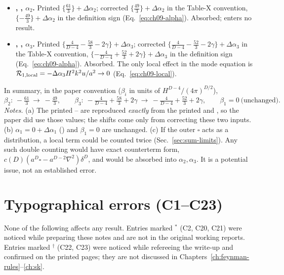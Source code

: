 \begin{itemize}[leftmargin=14pt,itemsep=2pt]
\item[\textbf{B5}] \textbf{\PII, , $\alpha_2$.} Printed $\{\tfrac{61}{3}\}+\Delta\alpha_2$; corrected $\{\tfrac{49}{3}\}+\Delta\alpha_2$ in the Table-X
convention, $\{-\tfrac{49}{3}\}+\Delta\alpha_2$ in the definition sign (Eq.~\eqref{eq:ch09-alpha}). Absorbed; enters no result.
\item[\textbf{B6}] \textbf{\PII, , $\alpha_3$.} Printed $\{\tfrac{4}{D-4}-\tfrac{58}{3}-2\gamma\}+\Delta\alpha_3$; corrected
$\{\tfrac{4}{D-4}-\tfrac{52}{3}-2\gamma\}+\Delta\alpha_3$ in the Table-X convention, $\{-\tfrac{4}{D-4}+\tfrac{52}{3}+2\gamma\}+\Delta\alpha_3$ in the
definition sign (Eq.~\eqref{eq:ch09-alpha}). Absorbed. The only local effect in the mode equation is
$\mathcal R_{1,\rm local}=-\Delta\alpha_3H^2k^2u/a^2\to0$ (Eq.~\eqref{eq:ch09-local}).
\end{itemize}
In summary, in the paper convention ($\beta_i$ in units of $H^{D-4}/(4\pi)^{D/2}$),
\[
\beta_2:\ -\tfrac{61}{3}\ \to\ -\tfrac{49}{3},\qquad
\beta_3:\ -\tfrac{4}{D-4}+\tfrac{58}{3}+2\gamma\ \to\ -\tfrac{4}{D-4}+\tfrac{52}{3}+2\gamma,\qquad \beta_1=0\ \text{(unchanged)} .
\]
\emph{Notes.} (a) The printed -- are reproduced \emph{exactly} from the printed  and , so the paper did use those
values; the shifts come only from correcting these two inputs. (b) $\alpha_1=0+\Delta\alpha_1$ () and $\beta_1=0$ are unchanged. (c) If the
outer $\square$ acts as a distribution, a local term could be counted twice (Sec.~\ref{sec:sum-limits}). Any such double counting would have exact
counterterm form, $c(D)(a^D\square-a^{D-2}\nabla^2)\delta^D$, and would be absorbed into $\alpha_2,\alpha_3$. It is a potential issue, not an
established error.

\section{Typographical errors (C1--C23)}
\label{sec:sum-typo}
None of the following affects any result. Entries marked $^\ast$ (C2, C20, C21) were noticed while preparing these notes and are not in the
original working reports. Entries marked $^\dagger$ (C22, C23) were noticed while refereeing the write-up and confirmed on the printed pages;
they are not discussed in Chapters~\ref{ch:feynman-rules}--\ref{ch:sk}.

